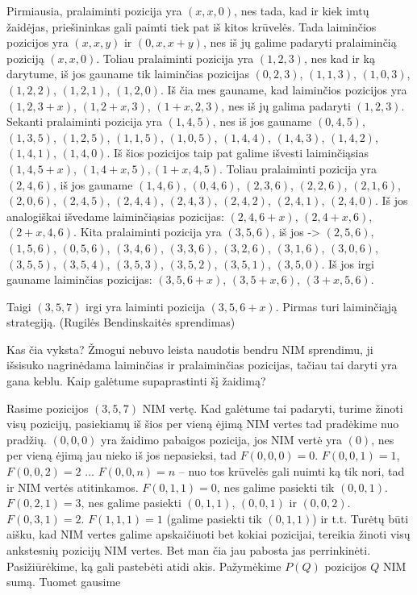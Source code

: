\begin{sprendimas}
Pirmiausia, pralaiminti pozicija yra $(x, x, 0)$, nes tada, kad ir kiek imtų
žaidėjas, priešininkas gali paimti tiek pat iš kitos krūvelės. Tada laiminčios
pozicijos yra $(x, x, y)$ ir $(0, x, x+y)$, nes iš jų galime padaryti
pralaiminčią poziciją $(x, x, 0)$. Toliau pralaiminti pozicija yra $(1, 2, 3)$,
nes kad ir ką darytume, iš jos gauname tik laiminčias pozicijas $(0, 2,
3)$, $(1, 1, 3)$, $(1, 0, 3)$, $(1, 2, 2)$, $(1, 2, 1)$, $(1, 2, 0)$. Iš čia mes gauname,
kad laiminčios pozicijos yra $(1, 2, 3+x)$, $(1, 2+x, 3)$, $(1+x, 2, 3)$, nes iš
jų galima padaryti $(1, 2, 3)$. Sekanti pralaiminti pozicija yra $(1, 4, 5)$,
nes iš jos gauname $(0, 4, 5)$, $(1, 3, 5)$, $(1, 2, 5)$, $(1, 1, 5)$, $(1, 0,
5)$, $(1, 4, 4)$, $(1, 4, 3)$, $(1, 4, 2)$, $(1, 4, 1)$, $(1, 4, 0)$. Iš šios
pozicijos taip pat galime išvesti laiminčiąsias $(1, 4, 5+x)$, $(1, 4+x, 5),
(1+x, 4, 5)$. Toliau pralaiminti pozicija yra $(2, 4, 6)$, iš jos gauname $(1,
4, 6)$, $(0, 4, 6)$, $(2, 3, 6)$, $(2, 2, 6)$, $(2, 1, 6)$, $(2, 0, 6)$, $(2,
4, 5)$, $(2, 4, 4)$, $(2, 4, 3)$, $(2, 4, 2)$, $(2, 4, 1)$, $(2, 4, 0)$.  Iš jos
analogiškai išvedame laiminčiąsias pozicijas: $(2, 4, 6+x)$, $(2, 4+x, 6)$,
$(2+x, 4, 6)$. Kita pralaiminti pozicija yra $(3, 5, 6)$, iš jos -> $(2, 5,
6)$, $(1, 5, 6)$, $(0, 5, 6)$, $(3, 4, 6)$, $(3, 3, 6)$, $(3, 2, 6)$, $(3, 1,
6)$, $(3, 0, 6)$, $(3, 5, 5)$, $(3, 5, 4)$, $(3, 5, 3)$, $(3, 5, 2)$, $(3,
5, 1)$, $( 3, 5, 0)$. Iš jos irgi gauname laiminčias pozicijas: $(3, 5,
6+x)$, $(3, 5+x, 6)$, $(3+x, 5, 6)$.

Taigi $(3, 5, 7)$ irgi yra laiminti pozicija $(3, 5, 6+x)$.  Pirmas turi
laiminčiąją strategiją.  (Rugilės Bendinskaitės sprendimas)
\end{sprendimas}

Kas čia vyksta? Žmogui nebuvo leista naudotis bendru NIM sprendimu, ji išsisuko
nagrinėdama laiminčias ir pralaiminčias pozicijas, tačiau tai daryti yra gana
keblu. Kaip galėtume supaprastinti šį žaidimą? 

Rasime pozicijos $(3,5,7)$ NIM vertę. Kad galėtume tai padaryti, turime žinoti
visų pozicijų, pasiekiamų iš šios per vieną ėjimą NIM vertes tad pradėkime nuo pradžių.
$(0,0,0)$ yra žaidimo pabaigos pozicija, jos NIM vertė yra $(0)$, nes per vieną
ėjimą jau nieko iš jos nepasieksi, tad $F(0,0,0)=0$. $F(0,0,1)=1$, $F(0,0,2)=2$
$\ldots$ $F(0,0,n)=n$ -- nuo tos krūvelės gali nuimti ką tik nori, tad ir NIM
vertės atitinkamos. $F(0,1,1)=0$, nes galime pasiekti tik $(0,0,1)$.
$F(0,2,1)=3$, nes galime pasiekti $(0,1,1)$, $(0,0,1)$ ir $(0,0,2)$.
$F(0,3,1)=2$. $F(1,1,1)=1$ (galime pasiekti tik $(0,1,1)$) ir t.t. Turėtų būti
aišku, kad NIM vertes galime apskaičiuoti bet kokiai pozicijai, tereikia žinoti
visų ankstesnių pozicijų NIM vertes. Bet man čia jau pabosta jas perrinkinėti.
Pasižiūrėkime, ką gali pastebėti atidi akis. Pažymėkime $P(Q)$ pozicijos
$Q$ NIM sumą. Tuomet gausime

